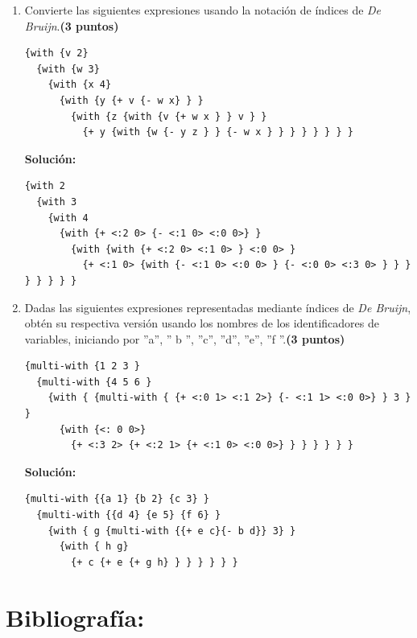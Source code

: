 \documentclass[11pt]{article}
\begin{document}
\begin{enumerate}[leftmargin=0.8cm]
    \item Convierte las siguientes expresiones usando la notación de índices de \textit{De Bruijn}.\textbf{(3 puntos)}
    \begin{lstlisting}
{with {v 2}
  {with {w 3}
    {with {x 4}
      {with {y {+ v {- w x} } }
        {with {z {with {v {+ w x } } v } }
          {+ y {with {w {- y z } } {- w x } } } } } } } }
    \end{lstlisting}

    \textbf{Solución:}

    \begin{lstlisting}
{with 2
  {with 3
    {with 4
      {with {+ <:2 0> {- <:1 0> <:0 0>} }
        {with {with {+ <:2 0> <:1 0> } <:0 0> }
          {+ <:1 0> {with {- <:1 0> <:0 0> } {- <:0 0> <:3 0> } } } } } } } }
    \end{lstlisting}


    \item Dadas las siguientes expresiones representadas mediante índices de \textit{De Bruijn}, obtén su respectiva versión usando los nombres de los identificadores de variables, iniciando por ”a”, ” b ”, ”c”, ”d”, ”e”, ”f ”.\textbf{(3 puntos)}

    \begin{lstlisting}
{multi-with {1 2 3 }
  {multi-with {4 5 6 }
    {with { {multi-with { {+ <:0 1> <:1 2>} {- <:1 1> <:0 0>} } 3 } }
      {with {<: 0 0>}
        {+ <:3 2> {+ <:2 1> {+ <:1 0> <:0 0>} } } } } } }
    \end{lstlisting}

    \textbf{Solución:}

    \begin{lstlisting}
{multi-with {{a 1} {b 2} {c 3} }
  {multi-with {{d 4} {e 5} {f 6} }
    {with { g {multi-with {{+ e c}{- b d}} 3} }
      {with { h g}
        {+ c {+ e {+ g h} } } } } } }
    \end{lstlisting}

\end{enumerate}

\section*{Bibliografía:}
\end{document}
